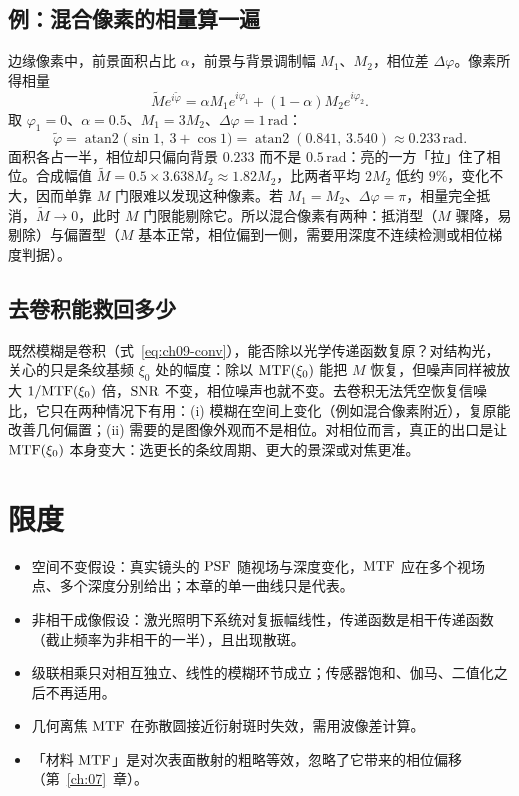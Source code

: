 \subsection{例：混合像素的相量算一遍}

边缘像素中，前景面积占比 $\alpha$，前景与背景调制幅 $M_1$、$M_2$，相位差 $\Delta\varphi$。像素所得相量
\[
  \tilde M e^{i\tilde\varphi}=\alpha M_1e^{i\varphi_1}+(1-\alpha)M_2e^{i\varphi_2}.
\]
取 $\varphi_1=0$、$\alpha=0.5$、$M_1=3M_2$、$\Delta\varphi=1\,\mathrm{rad}$：
\[
  \tilde\varphi=\operatorname{atan2}\bigl(\sin1,\ 3+\cos1\bigr)=\operatorname{atan2}(0.841,\,3.540)\approx0.233\,\mathrm{rad}.
\]
面积各占一半，相位却只偏向背景 $0.233$ 而不是 $0.5\,\mathrm{rad}$：亮的一方「拉」住了相位。合成幅值 $\tilde M=0.5\times3.638M_2\approx1.82M_2$，比两者平均 $2M_2$ 低约 $9\%$，变化不大，因而单靠 $M$ 门限难以发现这种像素。若 $M_1=M_2$、$\Delta\varphi=\pi$，相量完全抵消，$\tilde M\to0$，此时 $M$ 门限能剔除它。所以混合像素有两种：抵消型（$M$ 骤降，易剔除）与偏置型（$M$ 基本正常，相位偏到一侧，需要用深度不连续检测或相位梯度判据）。

\subsection{去卷积能救回多少}

既然模糊是卷积（式~\eqref{eq:ch09-conv}），能否除以光学传递函数复原？对结构光，关心的只是条纹基频 $\xi_0$ 处的幅度：除以 $\mathrm{MTF}(\xi_0)$ 能把 $M$ 恢复，但噪声同样被放大 $1/\mathrm{MTF}(\xi_0)$ 倍，$\mathrm{SNR}$ 不变，相位噪声也就不变。去卷积无法凭空恢复信噪比，它只在两种情况下有用：(i) 模糊在空间上变化（例如混合像素附近），复原能改善几何偏置；(ii) 需要的是图像外观而不是相位。对相位而言，真正的出口是让 $\mathrm{MTF}(\xi_0)$ 本身变大：选更长的条纹周期、更大的景深或对焦更准。

\section{限度}
\label{sec:ch08-limits}

\begin{itemize}
  \item 空间不变假设：真实镜头的 $\mathrm{PSF}$ 随视场与深度变化，$\mathrm{MTF}$ 应在多个视场点、多个深度分别给出；本章的单一曲线只是代表。
  \item 非相干成像假设：激光照明下系统对复振幅线性，传递函数是相干传递函数（截止频率为非相干的一半），且出现散斑。
  \item 级联相乘只对相互独立、线性的模糊环节成立；传感器饱和、伽马、二值化之后不再适用。
  \item 几何离焦 $\mathrm{MTF}$ 在弥散圆接近衍射斑时失效，需用波像差计算。
  \item 「材料 $\mathrm{MTF}$」是对次表面散射的粗略等效，忽略了它带来的相位偏移（第~\ref{ch:07}~章）。
\end{itemize}

